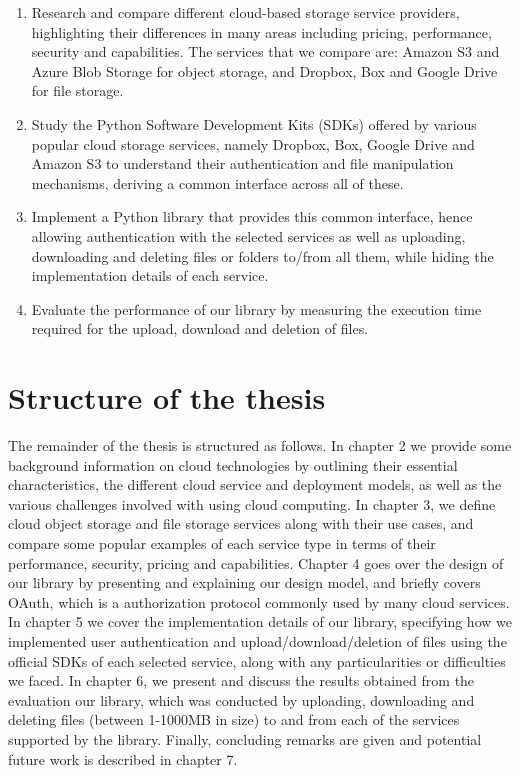 \begin{enumerate}
    \item Research and compare different cloud-based storage service providers, highlighting their differences in many areas including pricing, performance, security and capabilities. The services that we compare are: Amazon S3 and Azure Blob Storage for object storage, and Dropbox, Box and Google Drive for file storage.

    \item Study the Python Software Development Kits (SDKs) offered by various popular cloud storage services, namely Dropbox, Box, Google Drive and Amazon S3 to understand their authentication and file manipulation mechanisms, deriving a common interface across all of these.

    \item Implement a Python library that provides this common interface, hence allowing authentication with the selected services as well as uploading, downloading and deleting files or folders to/from all them, while hiding the implementation details of each service.

    \item Evaluate the performance of our library by measuring the execution time required for the upload, download and deletion of files.
\end{enumerate}

\section{Structure of the thesis}
The remainder of the thesis is structured as follows. In chapter 2 we provide some background information on cloud technologies by outlining their essential characteristics, the different cloud service and deployment models, as well as the various challenges involved with using cloud computing. In chapter 3, we define cloud object storage and file storage services along with their use cases, and compare some popular examples of each service type in terms of their performance, security, pricing and capabilities. Chapter 4 goes over the design of our library by presenting and explaining our design model, and briefly covers OAuth, which is a authorization protocol commonly used by many cloud services. In chapter 5 we cover the implementation details of our library, specifying how we implemented user authentication and upload/download/deletion of files using the official SDKs of each selected service, along with any particularities or difficulties we faced. In chapter 6, we present and discuss the results obtained from the evaluation our library, which was conducted by uploading, downloading and deleting files (between 1-1000MB in size) to and from each of the services supported by the library. Finally, concluding remarks are given and potential future work is described in chapter 7.
